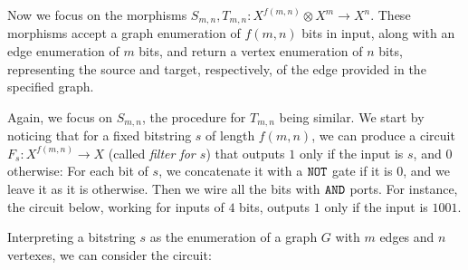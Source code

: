 Now we focus on the morphisms $S_{m,n}, T_{m,n}: X^{f(m,n)} \otimes X^m \to X^n $.
These morphisms accept a graph enumeration of $f(m,n)$ bits in input, along with an edge 
enumeration of $m$ bits, and return a vertex enumeration of $n$ bits, representing the 
source and target, respectively, of the edge provided in the specified graph.

Again, we focus on $S_{m,n}$, the procedure for $T_{m,n}$ being
similar. We start by noticing that for a fixed
bitstring $s$ of length $f(m,n)$, we can produce a circuit 
$F_s: X^{f(m,n)} \to X$ (called \emph{filter for $s$}) that outputs $1$ only 
if the input is $s$, and $0$ otherwise: For each bit of 
$s$, we concatenate it with a $\texttt{NOT}$ gate if it is $0$, and we leave it as it is 
otherwise. Then we wire all the bits with $\texttt{AND}$ ports. For instance, 
the circuit below, working for inputs of $4$ bits, 
outputs $1$ only if the input is $1001$.
%
%
\begin{center}
\end{center}
%
Interpreting a bitstring $s$ as the enumeration of a 
graph $G$ with $m$ edges and $n$ vertexes, we can consider the circuit:
%
%
